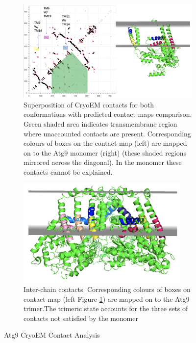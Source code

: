 \begin{figure}[htb]
    \centering %
\begin{subfigure}{0.75\textwidth}
  \includegraphics[width=95mm, scale=0.9]{introduction/cryo_cmap_anal.png}
  \caption{Superposition of CryoEM contacts for both conformations with predicted contact maps comparison.  Green shaded area indicates transmembrane region where unaccounted contacts are present. Corresponding colours of boxes on the contact map (left) are mapped on to the Atg9 monomer (right) (these shaded regions mirrored across the diagonal).  In the monomer these contacts cannot be explained.}
  \label{fig:4.16a}
\end{subfigure}\hfil %
\begin{subfigure}{0.75\textwidth}
  \includegraphics[width=85mm, scale=0.9]{introduction/cryo_cmap_anal2.png}
  \caption{Inter-chain contacts. Corresponding colours of boxes on contact map (left Figure \ref{fig:4.16a}) are mapped on to the Atg9 trimer.The trimeric state accounts for the three sets of contacts not satisfied by the monomer}
  \label{fig:4.16b}
  \small
  
\end{subfigure}\hfil %
\caption{Atg9 CryoEM Contact Analysis}
\small

\label{fig:atg9_conformation}
\end{figure}


